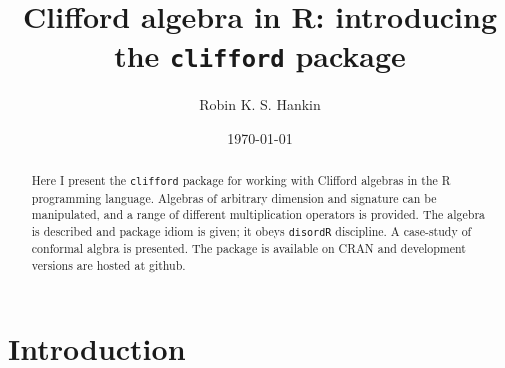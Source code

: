 \documentclass{birkjour}
\theoremstyle{definition}
\theoremstyle{remark}
\numberwithin{equation}{section}
\begin{document}
%
%
%
%
%
%
%
%
%

\title[Clifford algebra in R]{
 Clifford algebra in R: introducing the {\tt clifford} package}
\author[Hankin]{Robin K. S. Hankin}
\address{%
  University of Stirling\\
  Stirling FK9 4LH\\
  United Kingdom
}
%
%
%
%
\date{\today}
\begin{abstract}

Here I present the {\tt clifford} package for working with Clifford
algebras in the R programming language.  Algebras of arbitrary
dimension and signature can be manipulated, and a range of different
multiplication operators is provided.  The algebra is described and
package idiom is given; it obeys {\tt disordR} discipline.  A
case-study of conformal algbra is presented.  The package is available
on CRAN and development versions are hosted at github.


\end{abstract}
\label{page:firstblob}
\maketitle
\tableofcontents



\section{Introduction}
\end{document}
